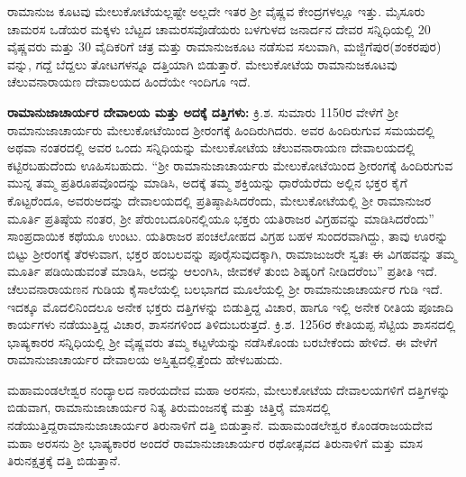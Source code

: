 ರಾಮಾನುಜ ಕೂಟವು ಮೇಲುಕೋಟೆಯಲ್ಲಷ್ಟೇ ಅಲ್ಲದೇ ಇತರ ಶ‍್ರೀ ವೈಷ್ಣವ ಕೇಂದ್ರಗಳಲ್ಲೂ ಇತ್ತು. ಮೈಸೂರು ಚಾಮರಸ ಒಡೆಯರ ಮಕ್ಕಳು ಬೆಟ್ಟದ ಚಾಮರಸವೊಡೆಯರು ಬಳಗುಳದ ಜನಾರ್ದನ ದೇವರ ಸನ್ನಿಧಿಯಲ್ಲಿ 20 ವೈಷ್ಣವರು ಮತ್ತು 30 ವೈದಿಕರಿಗೆ ಚತ್ರ ಮತ್ತು ರಾಮಾನುಜಕೂಟ ನಡೆಸುವ ಸಲುವಾಗಿ, ಮಜ್ಜಿಗೆಪುರ(ಶಂಕರಪುರ) ವನ್ನು, ಗದ್ದೆ ಬೆದ್ದಲು ತೋಟಗಳನ್ನೂ ದತ್ತಿಯಾಗಿ ಬಿಡುತ್ತಾರೆ. ಮೇಲುಕೋಟೆಯ ರಾಮಾನುಜಕೂಟವು ಚೆಲುವನಾರಾಯಣ ದೇವಾಲಯದ ಹಿಂದೆಯೇ ಇಂದಿಗೂ ಇದೆ.

\vskip 3pt

\textbf{ರಾಮಾನುಜಾಚಾರ್ಯರ ದೇವಾಲಯ ಮತ್ತು ಅದಕ್ಕೆ ದತ್ತಿಗಳು:} ಕ್ರಿ.ಶ. ಸುಮಾರು 1150ರ ವೇಳೆಗೆ ಶ‍್ರೀ ರಾಮಾನುಜಾಚಾರ್ಯರು ಮೇಲುಕೋಟೆಯಿಂದ ಶ‍್ರೀರಂಗಕ್ಕೆ ಹಿಂದಿರುಗಿದರು. ಅವರ ಹಿಂದಿರುಗುವ ಸಮಯದಲ್ಲಿ ಅಥವಾ ನಂತರದಲ್ಲಿ ಅವರ ಒಂದು ಸನ್ನಿಧಿಯನ್ನು ಮೇಲುಕೋಟೆಯ ಚೆಲುವನಾರಾಯಣ ದೇವಾಲಯದಲ್ಲಿ ಕಟ್ಟಿರಬಹು\-ದೆಂದು ಊಹಿಸಬಹುದು. “ಶ‍್ರೀ ರಾಮಾನುಜಾಚಾರ್ಯರು ಮೇಲುಕೋಟೆಯಿಂದ ಶ‍್ರೀರಂಗಕ್ಕೆ ಹಿಂದಿರುಗುವ ಮುನ್ನ ತಮ್ಮ ಪ್ರತಿರೂಪವೊಂದನ್ನು ಮಾಡಿಸಿ, ಅದಕ್ಕೆ ತಮ್ಮ ಶಕ್ತಿಯನ್ನು ಧಾರೆಯೆರೆದು ಅಲ್ಲಿನ ಭಕ್ತರ ಕೈಗೆ ಕೊಟ್ಟರೆಂದೂ, ಅವರು\break ಅದನ್ನು ದೇವಾಲಯದಲ್ಲಿ ಪ್ರತಿಷ್ಠಾಪಿಸಿದರೆಂದು, ಮೇಲುಕೋಟೆಯಲ್ಲಿ ಶ‍್ರೀ ರಾಮಾನುಜರ ಮೂರ್ತಿ ಪ್ರತಿಷ್ಠೆಯ ನಂತರ, ಶ‍್ರೀ ಪೆರುಂಬದೂರಿನಲ್ಲಿಯೂ ಭಕ್ತರು ಯತಿರಾಜರ ವಿಗ್ರಹವನ್ನು ಮಾಡಿಸಿದರೆಂದು” ಸಾಂಪ್ರದಾಯಿಕ ಕಥೆಯೂ ಉಂಟು. ಯತಿರಾಜರ ಪಂಚಲೋಹದ ವಿಗ್ರಹ ಬಹಳ ಸುಂದರವಾಗಿದ್ದು, ತಾವು ಊರನ್ನು ಬಿಟ್ಟು ಶ‍್ರೀರಂಗಕ್ಕೆ ತೆರಳುವಾಗ, ಭಕ್ತರ ಹಂಬಲವನ್ನು ಪೂರೈಸುವುದಕ್ಕಾಗಿ, ರಾಮಾಜುಜರೇ ಸ್ವತಃ ಈ ವಿಗಹವನ್ನು ತಮ್ಮ ಮೂರ್ತಿ ಪಡಿಯಿಡುವಂತೆ ಮಾಡಿಸಿ, ಅದನ್ನು ಆಲಂಗಿಸಿ, ಜೀವಕಳೆ ತುಂಬಿ ಶಿಷ್ಯರಿಗೆ ನೀಡಿದರೆಂಬ” ಪ್ರತೀತಿ ಇದೆ. ಚೆಲುವನಾರಾಯಣನ ಗುಡಿಯ ಕೈಸಾಲೆಯಲ್ಲಿ ಬಲಭಾಗದ ಮೂಲೆಯಲ್ಲಿ ಶ‍್ರೀ ರಾಮಾನುಜಾಚಾರ್ಯರ ಗುಡಿ ಇದೆ. ಇದಕ್ಕೂ ಮೊದಲಿನಿಂದಲೂ ಅನೇಕ ಭಕ್ತರು ದತ್ತಿಗಳನ್ನು ಬಿಡುತ್ತಿದ್ದ ವಿಚಾರ, ಹಾಗೂ ಇಲ್ಲಿ ಅನೇಕ ರೀತಿಯ ಪೂಜಾದಿ ಕಾರ್ಯಗಳು ನಡೆಯುತ್ತಿದ್ದ ವಿಚಾರ, ಶಾಸನಗಳಿಂದ ತಿಳಿದುಬರುತ್ತದೆ. ಕ್ರಿ.ಶ. 1256ರ ಕೇತಿಯಪ್ಪ ಸೆಟ್ಟಿಯ ಶಾಸನದಲ್ಲಿ ಭಾಷ್ಯಕಾರರ ಸನ್ನಿಧಿಯಲ್ಲಿ ಶ‍್ರೀ ವೈಷ್ಣವರು ತಮ್ಮ ಕಟ್ಟಳೆಯನ್ನು ನಡೆಸಿಕೊಂಡು ಬರಬೇಕೆಂದು ಹೇಳಿದೆ. ಈ ವೇಳೆಗೆ ರಾಮಾನುಜಾಚಾರ್ಯರ ದೇವಾಲಯ ಅಸ್ತಿತ್ವದಲ್ಲಿತ್ತೆಂದು ಹೇಳಬಹುದು.

\vskip 3pt

ಮಹಾಮಂಡಲೇಶ್ವರ ನಂದ್ಯಾಲದ ನಾರಯದೇವ ಮಹಾ ಅರಸನು, ಮೇಲುಕೋಟೆಯ ದೇವಾಲಯಗಳಿಗೆ ದತ್ತಿಗಳನ್ನು ಬಿಡುವಾಗ, ರಾಮಾನುಜಾಚಾರ್ಯರ ನಿತ್ಯ ತಿರುಮಂಜನಕ್ಕೆ ಮತ್ತು ಚಿತ್ತಿರೈ ಮಾಸದಲ್ಲಿ ನಡೆಯುತ್ತಿದ್ದ\break ರಾಮಾನುಜಾಚಾರ್ಯರ ತಿರುನಾಳಿಗೆ ದತ್ತಿ ಬಿಡುತ್ತಾನೆ. ಮಹಾಮಂಡಲೇಶ್ವರ ಕೊಂಡರಾಜಯದೇವ ಮಹಾ ಅರಸನು ಶ‍್ರೀ ಭಾಷ್ಯಕಾರರ ಅಂದರೆ ರಾಮಾನುಜಾಚಾರ್ಯರ ರಥೋತ್ಸವದ ತಿರುನಾಳಿಗೆ ಮತ್ತು ಮಾಸ ತಿರುನಕ್ಷತ್ರಕ್ಕೆ ದತ್ತಿ ಬಿಡುತ್ತಾನೆ.

